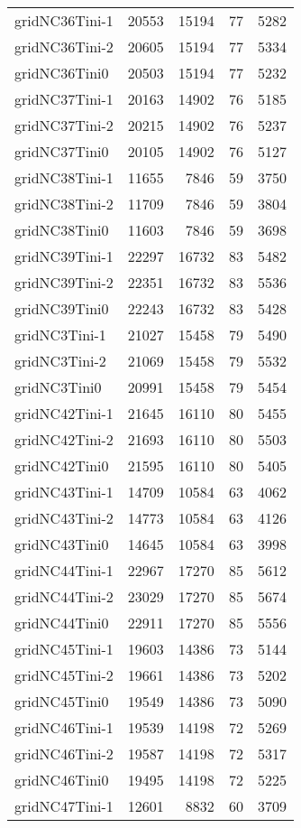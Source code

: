 \begin{tabular}{lrrrr}
gridNC36Tini-1 & 20553 & 15194 & 77 & 5282 \\
gridNC36Tini-2 & 20605 & 15194 & 77 & 5334 \\
gridNC36Tini0 & 20503 & 15194 & 77 & 5232 \\
gridNC37Tini-1 & 20163 & 14902 & 76 & 5185 \\
gridNC37Tini-2 & 20215 & 14902 & 76 & 5237 \\
gridNC37Tini0 & 20105 & 14902 & 76 & 5127 \\
gridNC38Tini-1 & 11655 & 7846 & 59 & 3750 \\
gridNC38Tini-2 & 11709 & 7846 & 59 & 3804 \\
gridNC38Tini0 & 11603 & 7846 & 59 & 3698 \\
gridNC39Tini-1 & 22297 & 16732 & 83 & 5482 \\
gridNC39Tini-2 & 22351 & 16732 & 83 & 5536 \\
gridNC39Tini0 & 22243 & 16732 & 83 & 5428 \\
gridNC3Tini-1 & 21027 & 15458 & 79 & 5490 \\
gridNC3Tini-2 & 21069 & 15458 & 79 & 5532 \\
gridNC3Tini0 & 20991 & 15458 & 79 & 5454 \\
gridNC42Tini-1 & 21645 & 16110 & 80 & 5455 \\
gridNC42Tini-2 & 21693 & 16110 & 80 & 5503 \\
gridNC42Tini0 & 21595 & 16110 & 80 & 5405 \\
gridNC43Tini-1 & 14709 & 10584 & 63 & 4062 \\
gridNC43Tini-2 & 14773 & 10584 & 63 & 4126 \\
gridNC43Tini0 & 14645 & 10584 & 63 & 3998 \\
gridNC44Tini-1 & 22967 & 17270 & 85 & 5612 \\
gridNC44Tini-2 & 23029 & 17270 & 85 & 5674 \\
gridNC44Tini0 & 22911 & 17270 & 85 & 5556 \\
gridNC45Tini-1 & 19603 & 14386 & 73 & 5144 \\
gridNC45Tini-2 & 19661 & 14386 & 73 & 5202 \\
gridNC45Tini0 & 19549 & 14386 & 73 & 5090 \\
gridNC46Tini-1 & 19539 & 14198 & 72 & 5269 \\
gridNC46Tini-2 & 19587 & 14198 & 72 & 5317 \\
gridNC46Tini0 & 19495 & 14198 & 72 & 5225 \\
gridNC47Tini-1 & 12601 & 8832 & 60 & 3709 \\

\end{tabular}
